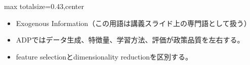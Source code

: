 \clearpage
{}
\begin{minipage}[t]{0.405\textwidth}
\begin{adjustbox}{max totalsize={\textwidth}{0.43\textheight},center}
\begin{minipage}{\textwidth}\scriptsize
{}\begin{itemize}
\item Exogenous Information（この用語は講義スライド上の専門語として扱う）
\end{itemize}\begin{itemize}
\item ADPではデータ生成、特徴量、学習方法、評価が政策品質を左右する。
\item feature selectionとdimensionality reductionを区別する。
\end{itemize}
\end{minipage}
\end{adjustbox}
\end{minipage}\hfill
